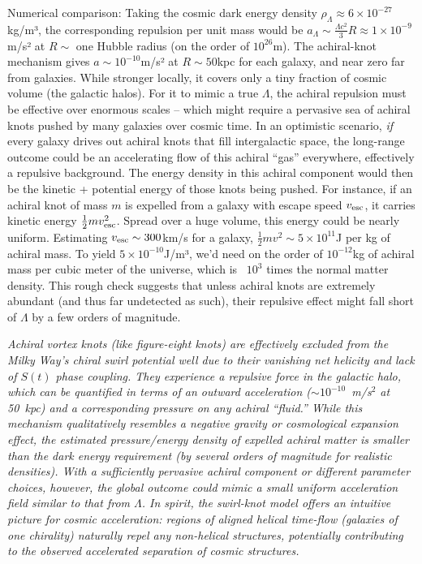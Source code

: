 Numerical comparison: Taking the cosmic dark energy density $\rho_\Lambda \approx 6\times10^{-27}$kg/m³, the corresponding repulsion per unit mass would be $a_\Lambda \sim \frac{\Lambda c^2}{3} R \approx 1\times10^{-9}$m/s² at $R\sim$ one Hubble radius (on the order of $10^{26}$m). The achiral-knot mechanism gives $a \sim10^{-10}$m/s² at $R\sim50$kpc for each galaxy, and near zero far from galaxies. While stronger locally, it covers only a tiny fraction of cosmic volume (the galactic halos). For it to mimic a true $\Lambda$, the achiral repulsion must be effective over enormous scales – which might require a pervasive sea of achiral knots pushed by many galaxies over cosmic time. In an optimistic scenario, \textit{if} every galaxy drives out achiral knots that fill intergalactic space, the long-range outcome could be an accelerating flow of this achiral “gas” everywhere, effectively a repulsive background. The energy density in this achiral component would then be the kinetic + potential energy of those knots being pushed. For instance, if an achiral knot of mass $m$ is expelled from a galaxy with escape speed $v_{\rm esc}$, it carries kinetic energy $\frac{1}{2}mv_{\rm esc}^2$. Spread over a huge volume, this energy could be nearly uniform. Estimating $v_{\rm esc}\sim 300$km/s for a galaxy, $\frac{1}{2}m v^2 \sim 5\times10^{11}$J per kg of achiral mass. To yield $5\times10^{-10}$J/m³, we’d need on the order of $10^{-12}$kg of achiral mass per cubic meter of the universe, which is ~$10^3$ times the normal matter density. This rough check suggests that unless achiral knots are extremely abundant (and thus far undetected as such), their repulsive effect might fall short of $\Lambda$ by a few orders of magnitude.


\textit{Achiral vortex knots (like figure-eight knots) are effectively excluded from the Milky Way’s chiral swirl potential well due to their vanishing net helicity and lack of $S(t)$ phase coupling. They experience a repulsive force in the galactic halo, which can be quantified in terms of an outward acceleration ($\sim 10^{-10}$~m/s$^2$ at 50~kpc) and a corresponding pressure on any achiral “fluid.” While this mechanism qualitatively resembles a negative gravity or cosmological expansion effect, the estimated pressure/energy density of expelled achiral matter is smaller than the dark energy requirement (by several orders of magnitude for realistic densities). With a sufficiently pervasive achiral component or different parameter choices, however, the global outcome could mimic a small uniform acceleration field similar to that from $\Lambda$. In spirit, the swirl-knot model offers an intuitive picture for cosmic acceleration: regions of aligned helical time-flow (galaxies of one chirality) naturally repel any non-helical structures, potentially contributing to the observed accelerated separation of cosmic structures.}



